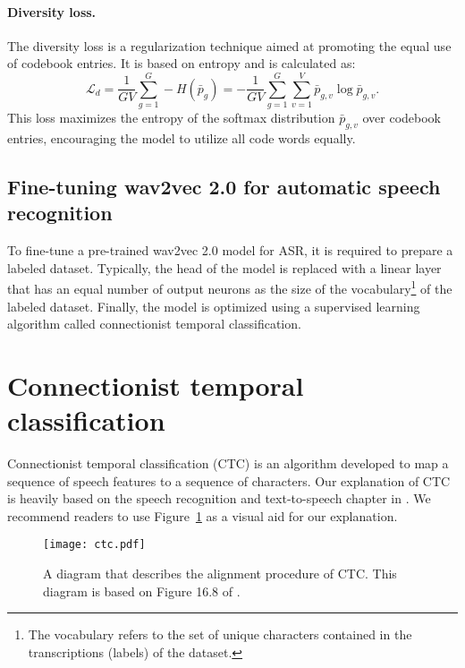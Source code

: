 \paragraph*{Diversity loss.}
The diversity loss is a regularization technique aimed at promoting the equal use of codebook entries. 
It is based on entropy and is calculated as:
\begin{equation}
    \mathcal{L}_d = \dfrac{1}{GV}\sum_{g=1}^{G} -H(\bar{p}_{g}) = -\dfrac{1}{GV}\sum_{g=1}^{G} \sum_{v=1}^{V} \bar{p}_{g,v} \log \bar{p}_{g,v}.
\end{equation}
This loss maximizes the entropy of the softmax distribution $\bar{p}_{g,v}$ over codebook entries, encouraging the model to utilize all code words equally.

\subsection{Fine-tuning wav2vec 2.0 for automatic speech recognition}\label{subsec:finetune}
To fine-tune a pre-trained wav2vec 2.0 model for ASR, it is required to prepare a labeled dataset.
Typically, the head of the model is replaced with a linear layer that has an equal number of output neurons as the size of the vocabulary\footnote{The vocabulary refers to the set of unique characters contained in the transcriptions (labels) of the dataset.} of the labeled dataset.
Finally, the model is optimized using a supervised learning algorithm called connectionist temporal classification.

\section{Connectionist temporal classification}\label{sec:ctc}
Connectionist temporal classification (CTC) \cite{graves2006connectionist} is an algorithm 
developed to map a sequence of speech features to a sequence of characters.
Our explanation of CTC is heavily based on the speech recognition and text-to-speech chapter in \cite{jurafskyspeech}.
We recommend readers to use Figure~\ref{ctc} as a visual aid for our explanation.

\begin{figure}[!ht]
    \centering
    \texttt{[image: ctc.pdf]}
    \caption{A diagram that describes the alignment procedure of CTC. This diagram is based on Figure 16.8 of \cite{jurafskyspeech}.}
    \label{ctc}
\end{figure}


